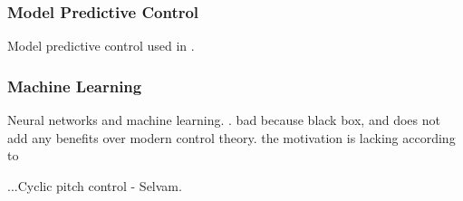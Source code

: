\subsubsection{Model Predictive Control}
Model predictive control used in \cite{6_Mirzaei}.
\subsubsection{Machine Learning}

Neural networks and machine learning. \cite{8_Wang} \cite{3_Treiber}. bad because black box, and does not add any benefits over modern control theory. the motivation is lacking according to \citet{15_bossanyi}

...Cyclic pitch control - Selvam.



